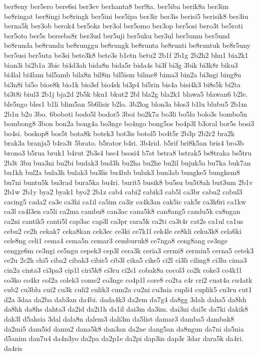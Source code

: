 {ber8eny ber5ero bere6si ber3ev berhanta8 ber9ia. ber5iba berik8a ber3im
be8ringat ber8ingi be8ringk ber5ini ber5ipa ber3ir ber3is berisi5 berisik8
ber3iu berna5k ber3ob berok4 ber5oks ber3ol ber5omo ber3op ber5osi bero3t
be5roti ber5oto ber5s berseba8r ber3ud ber5uji ber5uku ber3ul ber5umu
ber5und be8runda be8rundu be8runggu be8rungk be8runta be8runti be8runtuk
be8r5uny ber5usi ber5uta be3si bete3k8 bete3s b1etn betu2 2b1f 2b1g 2b2h2
bhu1 bia2k1 bian3i bi2b1a 3bic bi4d3ah bida8n bida5r bida4s bi3f bi3g 3bik
bi3k8r biku3 bi4lal bi4lam bil5amb bila8n bil8in bil5ism bilme8 bima3
bin2a bi3ngi bing8u bi3n8i bi5o bioe8k bio1k bio3sf bio4sk bi3p4 bi5rin
bis4a bisi4k3 bi8s5k bi2ta bi3t8i biul3 2b1j bja2d 2b5k bku1 bkut2 2bl
bla2g bla2k1 blawa5 blawan6 b2le. ble5ngo bles1 b1li blim5an 5b6lisir
b2lo. 3b2log blon3a blos3 b1lu blubu5 2b1m 2b1n b2o 3bo. 6boboti bodo5l
bodor5 3boi bo2k7a bo3li bo5lo bolo3s bombo5n bombong8 3bon bon2a bong4a
bo3nge bo4ngo bong5os bo4p3l b3oral bor5s bosi3 bo4si. boskop8 bos5t
bota8k botek3 bot3is botol5 bo4t5r 2b3p 2b2r2 bra2k brak3a branja5 b4ra3t
5brato. b5rator b4ri. 3b4rid. b5rif bri8k5an bris4 bro3b brono3 b5rua
bruk1 b4rut 2b3s4 bse4 bsosi4 b7st bstra8 bstrak5 bs8traka bs5tru 2b3t 3bu
bua3ni bu2bi budak3 bud3h bu2ha bu2he bu2il bujuk5a bu7ka buk7an bu1kh
bul2a bula3h bulak3 bu3lis bu4lub buluk3 bun3ab bungke5 bungkem8 bu7ni
buntu5k bu3rad bura5ka bu4ri. burit5 busik8 bu5su bu5t8ah but3um 2b1v 2b1w
2b1y bya2 byak1 byo2 2b1z cab4 cabi2 cabik3 cab5l ca3br cabu2 cabul3
cacing5 cada2 ca3e ca3hi ca1il ca5im ca3ir ca4k3an cak5ic cak5r ca3k6ri
ca1kw ca3l ca4l3en ca5li ca2ma cambu8 can3ac cana5k8 can8ang5 candu5k
ca8ngan ca2ni cantik5 canti5l cap3ac cap3l ca3pr cara5k ca2ti ca3t4r cat2s
ca1ul ca1us cebu2 ce2h cekak7 ceka8kan cek3ec ce3ki ce7k1l cek4le ce8kli
ceku3k8 cela6ki cele8ng celi1 cema4 cema5n cemar3 cemburuk8 ce7nga8
ceng8ang ce3nge cengge6m ce3ngi ce5ngu cepek3 cep3l cera3k ceria3 cermi8
cermin5 cerna5 cetek3 ce2u 2c2h chi5 ciba2 cibak3 cibir5 cib3l cika5 cike5
ci2l ci3li ciling8 ci3lu cima3 cin2a cinta3 ci3pa3 cip1l ciri5k8 ci3ru
ci2s1 cobak8a cocol3 co2k coke3 co4k1l co3ko co4kr col2a colek3 come2
co3nge co4p1l core8 co2ta c4r cri2 cuat4a cu4atk cub2 cu3blu cui2 cu3k
culi2 culik3 cum2a cu2ni cu3nia cupli4 cuplik5 cu3ru cut1 d2a 3daa da2ba
dab3an da4bi. dada4k3 da2em da7g4 da8gg 3dah daha5 da8hh da8hk da8hs
dahta3 da2id da2i1h da1il dai3m da3im. dai3ni dai5r da7ki dakik8 dak3l
d5aksia 3dal dala8n dalem3 dali3m da5list damar3 damba5 dambak8 da2mi5
dam5id damu2 dana5k8 dan3an da2ne dang5an da8ngun da7ni da5nia d5anim
dan7u4 da4n3yo da2pa da2p1e da2pi dap3in dap3r 3dar dara5k da4ri. da4ris
}
